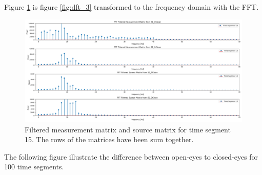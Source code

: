Figure \ref{fig:dft_4} is figure \ref{fig:dft_3} transformed to the frequency domain with the FFT.
\begin{figure}[H]
\centering
\includegraphics[scale=0.28]{figures/ch_7/DFT_plot_X_and_Y_matrix_timeseg15_power.png}
\caption{Filtered measurement matrix and source matrix for time segment 15. The rows of the matrices have been sum together.}
\label{fig:dft_4}
\end{figure}
\noindent
The following figure illustrate the difference between open-eyes to closed-eyes for 100 time segments.
